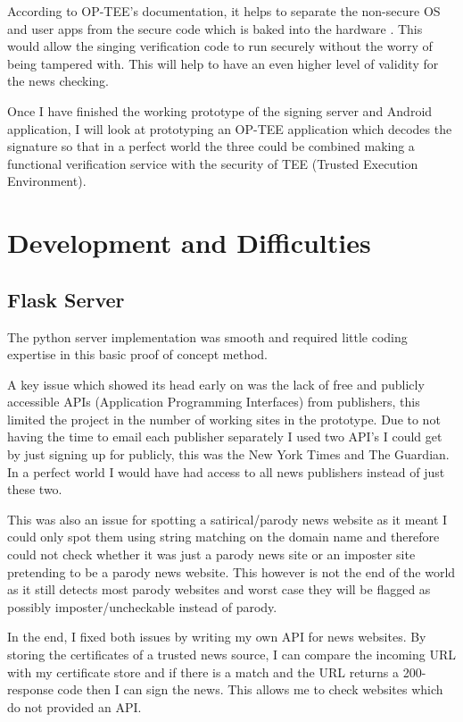 \documentclass[a4paper, 11pt]{article}
\begin{document}
According to OP-TEE’s documentation, it helps to separate the non-secure OS and user apps from the secure code which is baked into the hardware \cite{OP-TEE}. This would allow the singing verification code to run securely without the worry of being tampered with. This will help to have an even higher level of validity for the news checking.

Once I have finished the working prototype of the signing server and Android application, I will look at prototyping an OP-TEE application which decodes the signature so that in a perfect world the three could be combined making a functional verification service with the security of TEE (Trusted Execution Environment).

\newpage
\section{Development and Difficulties}
\subsection{Flask Server}
The python server implementation was smooth and required little coding expertise in this basic proof of concept method.

A key issue which showed its head early on was the lack of free and publicly accessible APIs (Application Programming Interfaces) from publishers, this limited the project in the number of working sites in the prototype. Due to not having the time to email each publisher separately I used two API’s I could get by just signing up for publicly, this was the New York Times and The Guardian. In a perfect world I would have had access to all news publishers instead of just these two.

This was also an issue for spotting a satirical/parody news website as it meant I could only spot them using string matching on the domain name and therefore could not check whether it was just a parody news site or an imposter site pretending to be a parody news website. This however is not the end of the world as it still detects most parody websites and worst case they will be flagged as possibly imposter/uncheckable instead of parody.

In the end, I fixed both issues by writing my own API for news websites. By storing the certificates of a trusted news source, I can compare the incoming URL with my certificate store and if there is a match and the URL returns a 200-response code then I can sign the news. This allows me to check websites which do not provided an API.
\end{document}
